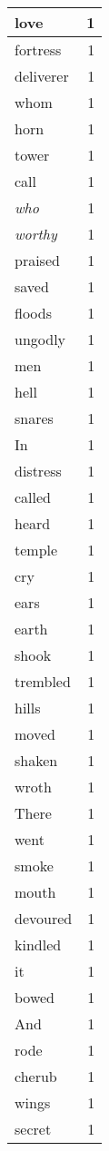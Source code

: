 \begin{center}
\begin{longtable}{l|r}
love & 1 \\ \hline
fortress & 1 \\ \hline
deliverer & 1 \\ \hline
whom & 1 \\ \hline
horn & 1 \\ \hline
tower & 1 \\ \hline
call & 1 \\ \hline
\emph{who} & 1 \\ \hline
\emph{worthy} & 1 \\ \hline
praised & 1 \\ \hline
saved & 1 \\ \hline
floods & 1 \\ \hline
ungodly & 1 \\ \hline
men & 1 \\ \hline
hell & 1 \\ \hline
snares & 1 \\ \hline
In & 1 \\ \hline
distress & 1 \\ \hline
called & 1 \\ \hline
heard & 1 \\ \hline
temple & 1 \\ \hline
cry & 1 \\ \hline
ears & 1 \\ \hline
earth & 1 \\ \hline
shook & 1 \\ \hline
trembled & 1 \\ \hline
hills & 1 \\ \hline
moved & 1 \\ \hline
shaken & 1 \\ \hline
wroth & 1 \\ \hline
There & 1 \\ \hline
went & 1 \\ \hline
smoke & 1 \\ \hline
mouth & 1 \\ \hline
devoured & 1 \\ \hline
kindled & 1 \\ \hline
it & 1 \\ \hline
bowed & 1 \\ \hline
And & 1 \\ \hline
rode & 1 \\ \hline
cherub & 1 \\ \hline
wings & 1 \\ \hline
secret & 1 \\ \hline

\end{longtable}
\end{center}
